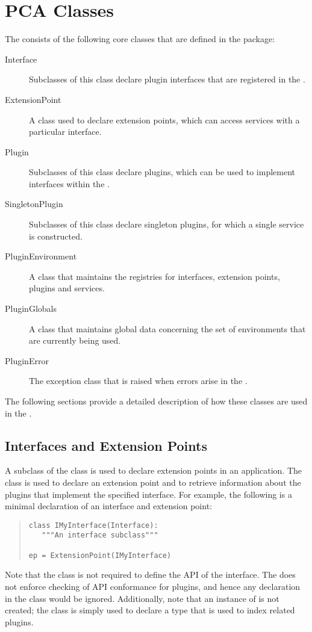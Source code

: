 \section{PCA Classes}
\label{chap:core}

The \pcasp consists of the following core classes that are defined in the  package:
\begin{description}
\item[Interface] Subclasses of this class declare plugin interfaces that are registered in the \pca. 
\item[ExtensionPoint] A class used to declare extension points, which can access services with a particular interface.
\item[Plugin] Subclasses of this class declare plugins, which can be used to implement interfaces within the \pca. 
\item[SingletonPlugin] Subclasses of this class declare singleton plugins, for which a single service is constructed. 
\item[PluginEnvironment] A class that maintains the registries for interfaces, extension points, plugins and services. 
\item[PluginGlobals] A class that maintains global data concerning the set of environments that are currently being used. 
\item[PluginError] The exception class that is raised when errors arise in the \pca. 
\end{description}
The following sections provide a detailed description of how these classes are used in the
\pca.

\subsection{Interfaces and Extension Points}

A subclass of the  class is used to declare extension
points in an application. The  class is used to
declare an extension point and to retrieve information about the plugins
that implement the specified interface. For example, the following is
a minimal declaration of an interface and extension point:
\begin{quotation}
\begin{lstlisting}
class IMyInterface(Interface):
   """An interface subclass"""

ep = ExtensionPoint(IMyInterface)
\end{lstlisting}
\end{quotation}
Note that the  class is not required to define the API
of the interface. The \pcasp does not enforce checking of API conformance
for plugins, and hence any declaration in the 
class would be ignored. Additionally, note that an instance of
 is not created; the  class is simply
used to declare a type that is used to index related plugins.

